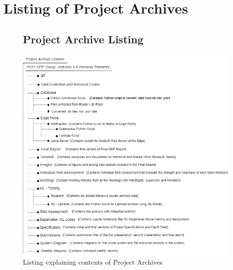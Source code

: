 \chapter{Listing of Project Archives}

\begin{figure}
\begin{minipage}{\linewidth}
\section{Project Archive Listing}
    \centering
    \includegraphics[width=1\linewidth]{images/Listing Directory.png}
    \caption{Listing explaining contents of Project Archives}
    \label{appendix:project_archive_listing}
\end{minipage}
\end{figure}
